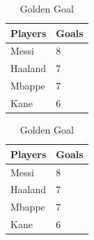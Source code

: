 \documentclass[11pt]{article}
\begin{document}
\begin{table}[]
    \centering
    \begin{tabular}{|l|l|}
    \hline
        Players & Goals \\
        \hline
         Messi & 8 \\ 
         Haaland &7 \\
         Mbappe & 7 \\
         Kane &6\\
         \hline
    \end{tabular}
    \caption{Golden Goal }
    \label{tab:placeholder}
\end{table}

\begin{table}[h]
    \centering
    \begin{tabular}{|l|l|}
    \hline
        Players & Goals \\
        \hline
         Messi & 8 \\ 
         Haaland &7 \\
         Mbappe & 7 \\
         Kane &6\\
         \hline
    \end{tabular}
    \caption{Golden Goal }
    \label{tab:placeholder}
\end{table}
 
\end{document}
